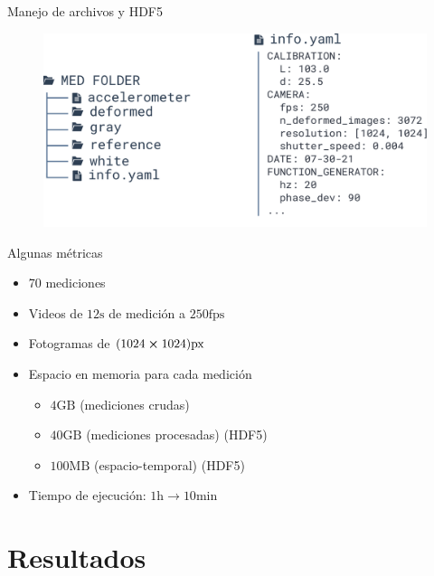 \documentclass[aspectratio=169]{beamer}
\begin{document}
\begin{frame}{Manejo de archivos y HDF5}
	\begin{figure}
		\centering
		\includegraphics[width=1\textwidth]{figs/med_folder_infoyaml.pdf}
	\end{figure}
\end{frame}


\begin{frame}{Algunas métricas} %
	\begin{itemize}
		\item 70 mediciones
		\item Videos de $12\text{s}$ de medición a $250\text{fps}$ 
		\item Fotogramas de $(1024\cross1024)\text{px}$
		\item Espacio en memoria para cada medición
			\begin{itemize}
				\item $4\text{GB}$ (mediciones crudas)
				\item $40\text{GB}$ (mediciones procesadas) (HDF5)
				\item $100\text{MB}$ (espacio-temporal) (HDF5)
			\end{itemize}
		\item Tiempo de ejecución: $1\text{h} \rightarrow 10\text{min}$
	\end{itemize}
\end{frame}


\section{Resultados}
\end{document}
